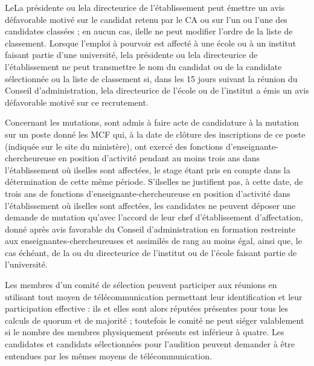 Le\mp La pr\'esident\mp e ou le\mp la directeur\mp ice de l'\'etablissement peut \'emettre un avis d\'efavorable motiv\'e sur le candidat retenu par
le CA ou sur l'un ou l'une des candidat\mp e\mp s class\'e\mp e\mp s ; en aucun cas, il\mp elle ne peut modifier l'ordre de la liste de classement.
Lorsque l'emploi \`a pourvoir est affect\'e \`a une \'ecole ou \`a un institut faisant partie d'une universit\'e, le\mp la pr\'esident\mp e ou
le\mp la directeur\mp ice de l'\'etablissement ne peut transmettre le nom du candidat ou de la candidate s\'electionn\'e\mp e ou la liste de classement si,
dans les 15 jours suivant la r\'eunion du Conseil d'administration, le\mp la directeur\mp ice de l'\'ecole ou de l'institut a \'emis un
avis d\'efavorable motiv\'e sur ce recrutement.

Concernant les mutations, sont admis \`a faire acte de candidature \`a la mutation sur un poste donn\'e les MCF qui, \`a la date de cl\^oture des inscriptions de ce poste (indiqu\'ee sur le site du minist\`ere), ont exerc\'e des fonctions d'enseignant\mp e-chercheur\mp euse en position d'activit\'e pendant au moins trois ans dans l'\'etablissement o\`u ils\mp elles sont affect\'e\mp e\mp s, le stage \'etant pris en compte dans la d\'etermination de cette m\^eme p\'eriode. S'ils\mp elles ne justifient pas, \`a cette date, de trois ans de fonctions d'enseignant\mp e-chercheur\mp euse en position d'activit\'e dans l'\'etablissement o\`u ils\mp elles sont affect\'e\mp e\mp s, les candidat\mp e\mp s ne peuvent d\'eposer une demande de mutation qu'avec l'accord de leur chef d'\'etablissement d'affectation, donn\'e apr\`es avis favorable du Conseil d'administration en formation restreinte aux enseignant\mp e\mp s-chercheur\mp euse\mp s et assimil\'es de rang au moins \'egal, ainsi que, le cas \'ech\'eant, de la ou du directeur\mp ice de l'institut ou de l'\'ecole faisant partie de l'universit\'e.

Les membres d'un comit\'e de s\'election peuvent participer aux r\'eunions en utilisant tout moyen de 
t\'el\'ecom\-munication permettant leur identification et leur participation effective : ils et elles sont alors r\'eput\'e\mp e\mp s pr\'esent\mp e\mp s pour
tous les calculs de quorum et de majorit\'e ; toutefois le comit\'e ne peut si\'eger valablement si le nombre des
membres physiquement pr\'esents est inf\'erieur \`a quatre.
Les candidates et candidats s\'electionn\'e\mp e\mp s pour l'audition peuvent demander \`a \^etre entendu\mp e\mp s par les m\^emes moyens de
t\'el\'ecommunication.

